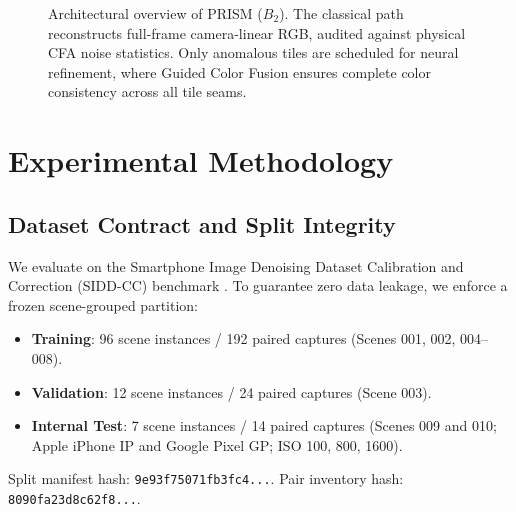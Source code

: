 \documentclass[10pt,twocolumn]{article}
\begin{document}
\begin{figure}[t]
\centering
{}
\caption{Architectural overview of PRISM ($B_2$). The classical path reconstructs full-frame camera-linear RGB, audited against physical CFA noise statistics. Only anomalous tiles are scheduled for neural refinement, where Guided Color Fusion ensures complete color consistency across all tile seams.}
\label{fig:architecture}
\end{figure}

\section{Experimental Methodology}

\subsection{Dataset Contract and Split Integrity}
We evaluate on the Smartphone Image Denoising Dataset Calibration and Correction (SIDD-CC) benchmark \cite{abdelhamed2018high}. To guarantee zero data leakage, we enforce a frozen scene-grouped partition:
\begin{itemize}
    \item \textbf{Training}: 96 scene instances / 192 paired captures (Scenes 001, 002, 004--008).
    \item \textbf{Validation}: 12 scene instances / 24 paired captures (Scene 003).
    \item \textbf{Internal Test}: 7 scene instances / 14 paired captures (Scenes 009 and 010; Apple iPhone IP and Google Pixel GP; ISO 100, 800, 1600).
\end{itemize}
Split manifest hash: \texttt{9e93f75071fb3fc4...}. Pair inventory hash: \texttt{8090fa23d8c62f8...}.
\end{document}
